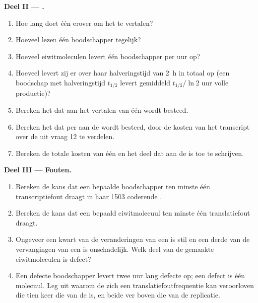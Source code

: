 \begin{problem}
\medskip
\noindent\textbf{Deel II --- .}
\begin{enumerate}[resume]
  \item Hoe lang doet één  erover om het  te vertalen?
  \item Hoeveel  lezen één boodschapper tegelijk?
  \item Hoeveel eiwitmoleculen levert één boodschapper per uur op?
  \item Hoeveel levert zij er over haar halveringstijd van \qty{2}{h} in
        totaal op (een boodschap met halveringstijd $t_{1/2}$ levert
        gemiddeld $t_{1/2}/\ln 2$ uur volle productie)?
  \item Bereken het  dat aan het vertalen van één  wordt besteed.
  \item Bereken het  dat per  aan de  wordt besteed,
        door de kosten van het transcript over de  uit vraag 12 te
        verdelen.
  \item Bereken de totale kosten van één  en het deel dat aan de
         is toe te schrijven.
\end{enumerate}

\medskip
\noindent\textbf{Deel III --- Fouten.}
\begin{enumerate}[resume]
  \item Bereken de kans dat een bepaalde boodschapper ten minste één
        transcriptiefout draagt in haar \qty{1503}{} coderende .
  \item Bereken de kans dat een bepaald eiwitmolecuul ten minste één
        translatiefout draagt.
  \item Ongeveer een kwart van de veranderingen van een  is stil
        en een derde van de vervangingen van een  is onschadelijk.
        Welk deel van de gemaakte eiwitmoleculen is defect?
  \item Een defecte boodschapper levert twee uur lang defecte  op;
        een defect  is één molecuul. Leg uit waarom de  zich een
        translatiefoutfrequentie kan veroorloven die tien keer die van de
         is, en beide ver boven die van de replicatie.
\end{enumerate}


\end{problem}
